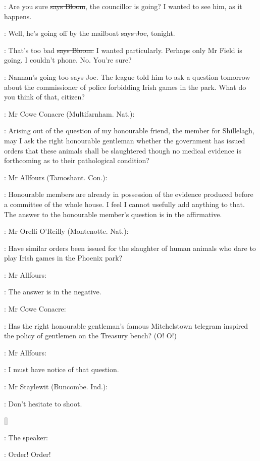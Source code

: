 \Bloom:
Are you sure
\sout{says Bloom},
the councillor is going?
I wanted to see him,
as it happens.

\joe:
Well,
he's going off by the mailboat
\sout{says Joe},
tonight.

\Bloom:
That's too bad
\sout{says Bloom.}
I wanted particularly.
Perhaps only Mr Field
is going.
I couldn't phone.
No.
You're sure?

\joe:
Nannan's going too
\sout{says Joe.}
The league told him to ask a question
tomorrow about the commissioner of police forbidding Irish games in the
park.
What do you think of that,
citizen?

:
Mr Cowe Conacre (Multifarnham.
Nat.):

\conacre:
Arising out of the question of my
honourable friend,
the member for Shillelagh,
may I ask the right
honourable gentleman whether the government has issued orders that these
animals shall be slaughtered though no medical evidence is forthcoming as
to their pathological condition?

:
Mr Allfours (Tamoshant.
Con.):

\allfours:
Honourable members are already in
possession of the evidence produced before a committee of the whole house.
I feel I cannot usefully add anything to that.
The answer to the
honourable member's question is in the affirmative.

:
Mr Orelli O'Reilly (Montenotte.
Nat.):


\oreilly:
Have similar orders been issued for
the slaughter of human animals
who dare to play Irish games in the
Phoenix park?

:
Mr Allfours:


\allfours:
The answer is in the negative.

:
Mr Cowe Conacre:


\conacre:
Has the right honourable gentleman's famous
Mitchelstown telegram inspired the policy of gentlemen on the Treasury
bench?
(O!
O!)

:
Mr Allfours:


\allfours:
I must have notice of that question.

:
Mr Staylewit (Buncombe.
Ind.):


\staylewit:
Don't hesitate to shoot.

[]

:
The speaker:

\Speaker:
Order!
Order!

